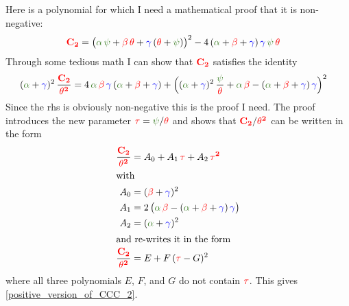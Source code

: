 \documentclass[legalpaper]{article}
\newcommand\mycdot{\,}
\newcommand\alphaC{{\color{OliveGreen}\mathbf\alpha}}
\newcommand\betaC{{\color{red}\mathbf\beta}}
\newcommand\gammaC{{\color{blue}\mathbf\gamma}}
\newcommand\psiC{{\color{OliveGreen}\mathbf\psi}}
\newcommand\thetaC{{\color{red}\mathbf\theta}}
\newcommand\CCCtwoC{{\color{red}\mathbf{C_2}}}
\newcommand\tauC{{\color{red}\mathbf\tau}}
\newcommand\tauSquaredC{{\color{red}\mathbf{\tau^2}}}
\newcommand\thetaSquaredC{{\color{red}\mathbf{\theta^2}}}
\begin{document}
  Here is a polynomial for which I need a mathematical proof that it is non-negative:
    \begin{align}
    \CCCtwoC&= \bigl(\alphaC{\mycdot}\psiC+\betaC{\mycdot}\thetaC+\gammaC{\mycdot}(\thetaC+\psiC)\bigr)^2
     -4{\mycdot}(\alphaC+\betaC+\gammaC){\mycdot}\gammaC{\mycdot}\psiC{\mycdot}\thetaC\label{CCC_2}
    \end{align}
 Through some tedious math I can show that \(\CCCtwoC\) satisfies the identity
  \begin{align}
    (\alphaC+\gammaC)^2{\mycdot}\frac{\CCCtwoC}{\thetaSquaredC}
    &=4{\mycdot}\alphaC{\mycdot}\betaC{\mycdot}\gammaC
    {\mycdot}(\alphaC+\betaC+\gammaC)
    +\Bigl((\alphaC+\gammaC)^2{\mycdot}\frac{\psiC}{\thetaC}+\alphaC{\mycdot}\betaC-(\alphaC+\betaC+\gammaC){\mycdot}\gammaC\Bigr)^2\label{positive_version_of_CCC_2}
  \end{align}
  Since the rhs is obviously non-negative this is the proof I need.  
  The proof introduces the new parameter \(\tauC=\psiC/\thetaC\) and shows that \(\CCCtwoC/\thetaSquaredC\) can be written in the form
            \begin{align}
      \frac{\CCCtwoC}{\thetaSquaredC}&= {A}_0 +  {A}_1{\mycdot}\tauC + {A}_2{\mycdot}\tauSquaredC\notag\\
     \intertext{with}
       {A}_0 &= (\betaC+\gammaC)^2\label{EEE_0}\\
       {A}_1 &= 2{\mycdot}\bigl(\alphaC{\mycdot}\betaC-(\alphaC+\betaC+\gammaC){\mycdot}\gammaC\bigr) \label{EEE_1}\\
       {A}_2 &= (\alphaC+\gammaC)^2 \label{EEE_2}\\
       \intertext{and re-writes it in the form}
       \frac{\CCCtwoC}{\thetaSquaredC}&= {E} +  {F}{\mycdot}(\tauC-{G})^2\notag
            \end{align}
            where all three polynomials \({E}\), \({F}\), and \({G}\) do not contain \(\tauC\).
            This gives \eqref{positive_version_of_CCC_2}.
\end{document}
